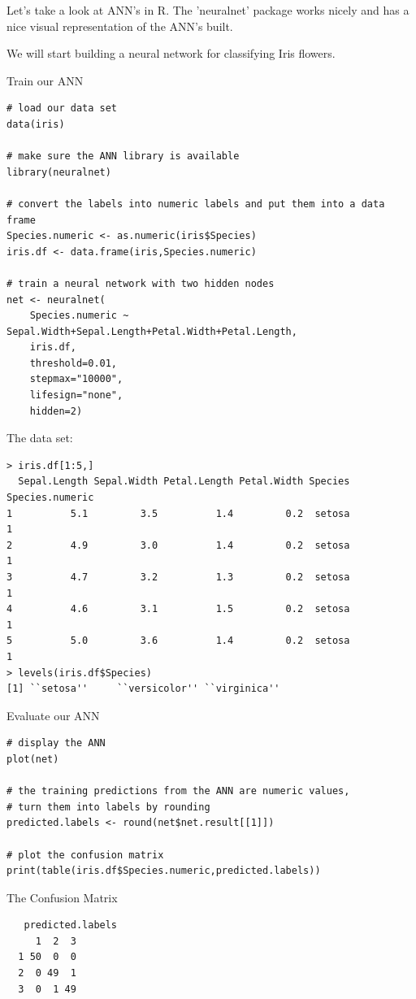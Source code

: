 \documentclass[a4paper,blends,pdf,colorBG,slideColor]{prosper}
\begin{document}
Let's take a look at ANN's in R.  The 'neuralnet' package works nicely and has
a nice visual representation of the ANN's built.

\vspace{.2in}

We will start building a neural network for classifying Iris flowers.
\es

Train our ANN
\scriptsize
\begin{verbatim}
# load our data set
data(iris)

# make sure the ANN library is available
library(neuralnet)

# convert the labels into numeric labels and put them into a data frame
Species.numeric <- as.numeric(iris$Species)
iris.df <- data.frame(iris,Species.numeric)

# train a neural network with two hidden nodes
net <- neuralnet(
    Species.numeric ~ Sepal.Width+Sepal.Length+Petal.Width+Petal.Length,
    iris.df,
    threshold=0.01,
    stepmax="10000",
    lifesign="none",
    hidden=2)
\end{verbatim}
\es


The data set:
\scriptsize
\begin{verbatim}
> iris.df[1:5,]
  Sepal.Length Sepal.Width Petal.Length Petal.Width Species Species.numeric
1          5.1         3.5          1.4         0.2  setosa               1
2          4.9         3.0          1.4         0.2  setosa               1
3          4.7         3.2          1.3         0.2  setosa               1
4          4.6         3.1          1.5         0.2  setosa               1
5          5.0         3.6          1.4         0.2  setosa               1
> levels(iris.df$Species)
[1] ``setosa''     ``versicolor'' ``virginica'' 
\end{verbatim}
\es

Evaluate our ANN
{
\scriptsize
\begin{verbatim}
# display the ANN
plot(net)

# the training predictions from the ANN are numeric values, 
# turn them into labels by rounding
predicted.labels <- round(net$net.result[[1]])

# plot the confusion matrix
print(table(iris.df$Species.numeric,predicted.labels))
\end{verbatim}
}

\vspace{.2in}
The Confusion Matrix
{
\scriptsize
\begin{verbatim}
   predicted.labels
     1  2  3
  1 50  0  0
  2  0 49  1
  3  0  1 49
\end{verbatim}
}
\end{document}

